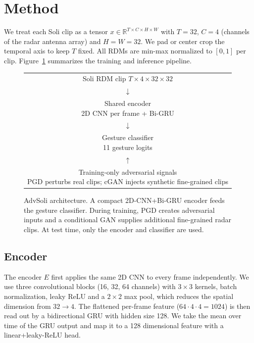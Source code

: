 \documentclass[10pt,twocolumn,letterpaper]{article}
\begin{document}
\section{Method}
\label{sec:method}

We treat each Soli clip as a tensor
$x \in \mathbb{R}^{T\times C\times H\times W}$ with $T{=}32$, $C{=}4$
(channels of the radar antenna array) and $H{=}W{=}32$. We pad or
center crop the temporal axis to keep $T$ fixed. All RDMs are min-max
normalized to $[0,1]$ per clip. Figure~\ref{fig:arch} summarizes the
training and inference pipeline.

\begin{figure}[t]
\centering
\small
\setlength{\fboxsep}{4pt}
\renewcommand{\arraystretch}{1.15}
\begin{tabular}{c}
\fbox{\parbox{0.86\linewidth}{\centering Soli RDM clip\\
$T{\times}4{\times}32{\times}32$}}\\[-1pt]
$\downarrow$\\[-1pt]
\fbox{\parbox{0.86\linewidth}{\centering Shared encoder\\
2D CNN per frame + Bi-GRU}}\\[-1pt]
$\downarrow$\\[-1pt]
\fbox{\parbox{0.86\linewidth}{\centering Gesture classifier\\
11 gesture logits}}\\[-1pt]
$\uparrow$\\[-1pt]
\fbox{\parbox{0.86\linewidth}{\centering Training-only adversarial signals\\
PGD perturbs real clips; cGAN injects synthetic fine-grained clips}}
\end{tabular}
\caption{AdvSoli architecture. A compact 2D-CNN+Bi-GRU encoder feeds
the gesture classifier. During training, PGD creates adversarial
inputs and a conditional GAN supplies additional fine-grained radar
clips. At test time, only the encoder and classifier are used.}
\label{fig:arch}
\end{figure}

\subsection{Encoder}
\label{sec:enc}
The encoder $E$ first applies the same 2D CNN to every frame
independently. We use three convolutional blocks (16, 32, 64 channels)
with $3\times3$ kernels, batch normalization, leaky ReLU and a
$2\times2$ max pool, which reduces the spatial dimension from
$32\to4$. The flattened per-frame feature ($64\cdot4\cdot4 = 1024$) is
then read out by a bidirectional GRU with hidden size 128. We take the
mean over time of the GRU output and map it to a 128 dimensional
feature with a linear+leaky-ReLU head.
\end{document}
